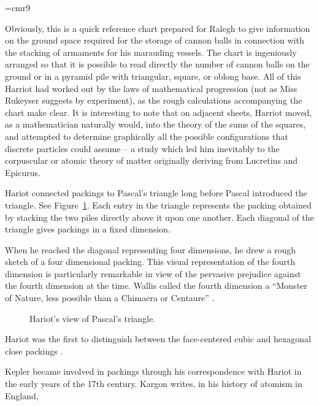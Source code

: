 {
\narrower
\font\ninerm=cmr9
\ninerm

    Obviously, this is a quick reference chart prepared for Ralegh to give information on the ground space required for the storage of cannon
    balls in connection with the stacking of armaments for his marauding vessels. The chart is ingeniously arranged so that it is possible to
    read directly the number of cannon balls on the ground or in a pyramid pile with triangular, square, or oblong base. All of this Harriot had
    worked out by the laws of mathematical progression (not as Miss Rukeyser suggests by experiment), as the rough calculations
    accompanying the chart make clear. It is interesting to note that on adjacent sheets, Harriot moved, as a mathematician naturally would,
    into the theory of the sums of the squares, and attempted to determine graphically all the possible configurations that discrete particles
    could assume -- a study which led him inevitably to the corpuscular or atomic theory of matter originally deriving from Lucretius and
    Epicurus. \cite[p.242]{Shi83}

}

\smallskip
Hariot connected packings to Pascal's triangle long before
Pascal introduced the triangle. See Figure~\ref{fig:pascal}.  Each entry in the triangle represents the packing obtained
by stacking the two piles directly above it upon one another.  Each
diagonal of the triangle gives packings in a fixed dimension.

When he reached the diagonal representing four dimensions, he drew a
rough sketch of a four dimensional packing.
This visual representation of the fourth dimension is particularly
remarkable in view of the pervasive prejudice against the fourth dimension
at the time.  Wallis called the fourth dimension a ``Monster of Nature, less possible than a Chimaera or Centaure'' 
\cite{Ban}.

\begin{figure}[htb]
  \centering
  \caption{Hariot's view of Pascal's triangle.}
  \label{fig:pascal}
\end{figure}

Hariot was the first to distinguish between the face-centered
cubic and hexagonal close packings \cite[p.52]{Mas66}.

Kepler 
became involved in packings through his correspondence
with Hariot in the early years of the 17th century.
Kargon writes, in his history of atomism in England,


